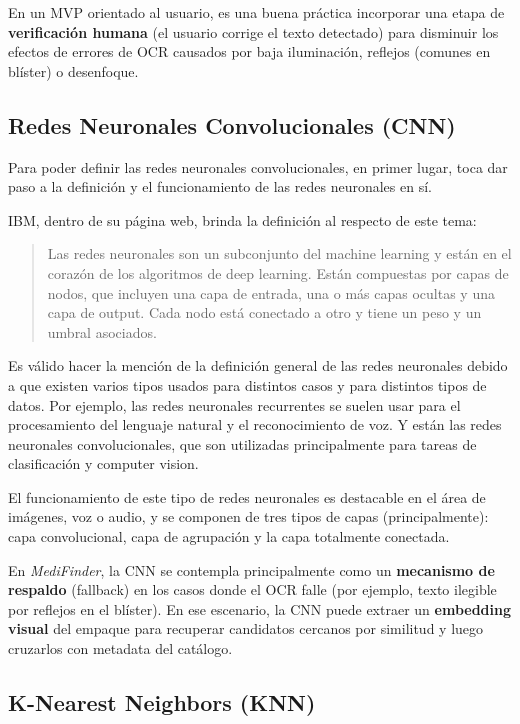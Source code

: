 En un MVP orientado al usuario, es una buena práctica incorporar una etapa de \textbf{verificación humana} (el usuario corrige el texto detectado) para disminuir los efectos de errores de OCR causados por baja iluminación, reflejos (comunes en blíster) o desenfoque.

\subsection{Redes Neuronales Convolucionales (CNN)}

Para poder definir las redes neuronales convolucionales, en primer lugar, toca dar paso a la definición y el funcionamiento de las redes neuronales en sí.

IBM, dentro de su página web, brinda la definición al respecto de este tema:

\begin{quote}
	Las redes neuronales son un subconjunto del machine learning y están en el corazón de los algoritmos de deep learning. Están compuestas por capas de nodos, que incluyen una capa de entrada, una o más capas ocultas y una capa de output. Cada nodo está conectado a otro y tiene un peso y un umbral asociados. \cite{ibm2025cnn}
\end{quote}

Es válido hacer la mención de la definición general de las redes neuronales debido a que existen varios tipos usados para distintos casos y para distintos tipos de datos. Por ejemplo, las redes neuronales recurrentes se suelen usar para el procesamiento del lenguaje natural y el reconocimiento de voz. Y están las redes neuronales convolucionales, que son utilizadas principalmente para tareas de clasificación y computer vision.

El funcionamiento de este tipo de redes neuronales es destacable en el área de imágenes, voz o audio, y se componen de tres tipos de capas (principalmente): capa convolucional, capa de agrupación y la capa totalmente conectada.

En \textit{MediFinder}, la CNN se contempla principalmente como un \textbf{mecanismo de respaldo} (fallback) en los casos donde el OCR falle (por ejemplo, texto ilegible por reflejos en el blíster). En ese escenario, la CNN puede extraer un \textbf{embedding visual} del empaque para recuperar candidatos cercanos por similitud y luego cruzarlos con metadata del catálogo.

\subsection{K-Nearest Neighbors (KNN)}

